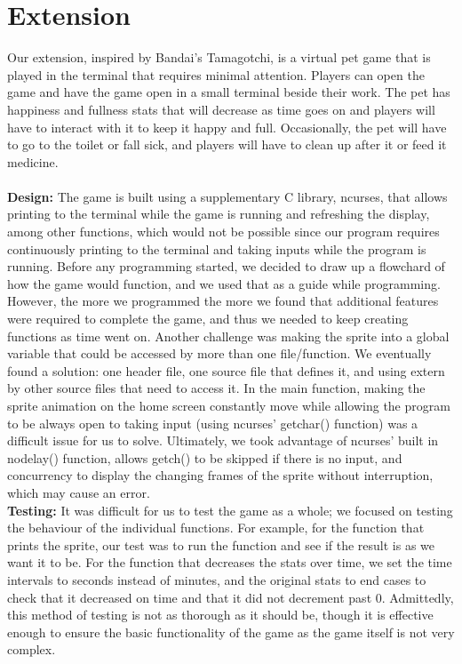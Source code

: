 \documentclass[11pt]{article}
\begin{document}
\section{Extension}
Our extension, inspired by Bandai’s Tamagotchi, is a virtual pet game that is played in the terminal that requires minimal attention. Players can open the game and have the game open in a small terminal beside their work. The pet has happiness and fullness stats that will decrease as time goes on and players will have to interact with it to keep it happy and full. Occasionally, the pet will have to go to the toilet or fall sick, and players will have to clean up after it or feed it medicine.\\\\
\textbf{Design:}
The game is built using a supplementary C library, ncurses, that allows printing to the terminal while the game is running and refreshing the display, among other functions, which would not be possible since our program requires continuously printing to the terminal and taking inputs while the program is running.
Before any programming started, we decided to draw up a flowchard of how the game would function, and we used that as a guide while programming. However, the more we programmed the more we found that additional features were required to complete the game, and thus we needed to keep creating functions as time went on.
Another challenge was making the sprite into a global variable that could be accessed by more than one file/function. We eventually found a solution: one header file, one source file that defines it, and using extern by other source files that need to access it.
In the main function, making the sprite animation on the home screen constantly move while allowing the program to be always open to taking input (using ncurses’ getchar() function) was a difficult issue for us to solve. Ultimately, we took advantage of ncurses’ built in nodelay() function, allows getch() to be skipped if there is no input, and concurrency to display the changing frames of the sprite without interruption, which may cause an error.\\
\textbf{Testing: }
It was difficult for us to test the game as a whole; we focused on testing the behaviour of the individual functions. For example, for the function that prints the sprite, our test was to run the function and see if the result is as we want it to be. For the function that decreases the stats over time, we set the time intervals to seconds instead of minutes, and the original stats to end cases to check that it decreased on time and that it did not decrement past 0.
Admittedly, this method of testing is not as thorough as it should be, though it is effective enough to ensure the basic functionality of the game as the game itself is not very complex.
\end{document}
